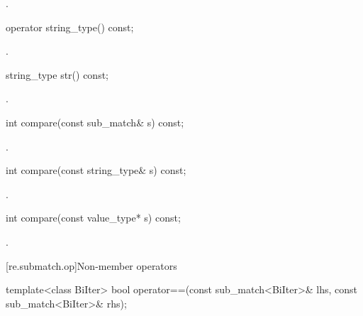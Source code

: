 \begin{itemdescr}
\pnum\returns {}.
\end{itemdescr}

%
\begin{itemdecl}
operator string_type() const;
\end{itemdecl}

\begin{itemdescr}
\pnum\returns {}.
\end{itemdescr}

%
\begin{itemdecl}
string_type str() const;
\end{itemdecl}

\begin{itemdescr}
\pnum\returns {}.
\end{itemdescr}

%
\begin{itemdecl}
int compare(const sub_match& s) const;
\end{itemdecl}

\begin{itemdescr}
\pnum\returns {}.
\end{itemdescr}

%
\begin{itemdecl}
int compare(const string_type& s) const;
\end{itemdecl}

\begin{itemdescr}
\pnum\returns {}.
\end{itemdescr}

%
\begin{itemdecl}
int compare(const value_type* s) const;
\end{itemdecl}

\begin{itemdescr}
\pnum\returns {}.
\end{itemdescr}

[re.submatch.op]{Non-member operators}

%
\begin{itemdecl}
template<class BiIter>
  bool operator==(const sub_match<BiIter>& lhs, const sub_match<BiIter>& rhs);
\end{itemdecl}

